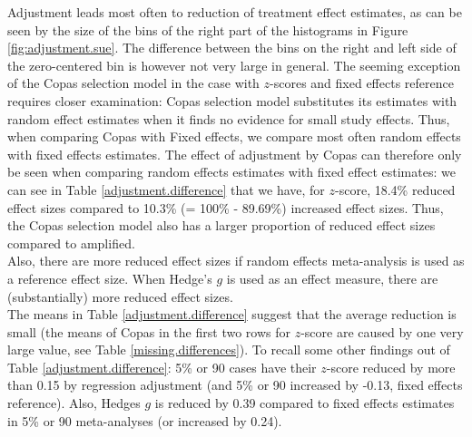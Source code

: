 Adjustment leads most often to reduction of treatment effect estimates, as can be seen by the size of the bins of the right part of the histograms in Figure \ref{fig:adjustment.sue}. The difference between the bins on the right and left side of the zero-centered bin is however not very large in general. The seeming exception of the Copas selection model in the case with $z$-scores and fixed effects reference requires closer examination: Copas selection model substitutes its estimates with random effect estimates when it finds no evidence for small study effects. Thus, when comparing Copas with Fixed effects, we compare most often random effects with fixed effects estimates. The effect of adjustment by Copas can therefore only be seen when comparing random effects estimates with fixed effect estimates: we can see in Table \ref{adjustment.difference} that we have, for $z$-score, 18.4\% reduced effect sizes compared to 10.3\% (= 100\% - 89.69\%) increased effect sizes. Thus, the Copas selection model also has a larger proportion of reduced effect sizes compared to amplified.\\
Also, there are more reduced effect sizes if random effects meta-analysis is used as a reference effect size. When Hedge's $g$ is used as an effect measure, there are (substantially) more reduced effect sizes. \\
The means in Table \ref{adjustment.difference} suggest that the average reduction is small (the means of Copas in the first two rows for $z$-score are caused by one very large value, see Table \ref{missing.differences}). To recall some other findings out of Table \ref{adjustment.difference}: 5\% or 90 cases have their $z$-score reduced by more than 0.15 by regression adjustment (and 5\% or 90 increased by -0.13, fixed effects reference). Also, Hedges $g$ is reduced by 0.39 compared to fixed effects estimates in 5\% or 90 meta-analyses (or increased by 0.24).



